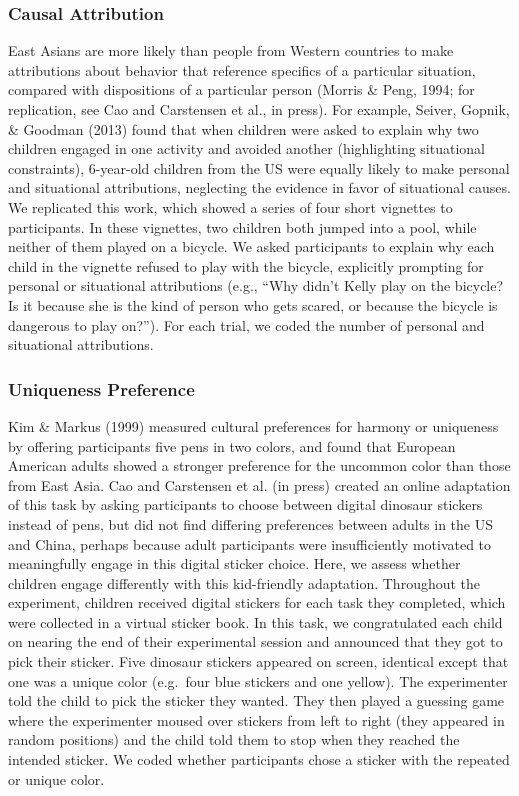 \documentclass[10pt, letterpaper]{article}
\begin{document}
\hypertarget{causal-attribution}{%
\subsubsection{Causal Attribution}\label{causal-attribution}}

East Asians are more likely than people from Western countries to make
attributions about behavior that reference specifics of a particular
situation, compared with dispositions of a particular person (Morris \&
Peng, 1994; for replication, see Cao and Carstensen et al., in press).
For example, Seiver, Gopnik, \& Goodman (2013) found that when children
were asked to explain why two children engaged in one activity and
avoided another (highlighting situational constraints), 6-year-old
children from the US were equally likely to make personal and
situational attributions, neglecting the evidence in favor of
situational causes. We replicated this work, which showed a series of
four short vignettes to participants. In these vignettes, two children
both jumped into a pool, while neither of them played on a bicycle. We
asked participants to explain why each child in the vignette refused to
play with the bicycle, explicitly prompting for personal or situational
attributions (e.g., ``Why didn't Kelly play on the bicycle? Is it
because she is the kind of person who gets scared, or because the
bicycle is dangerous to play on?''). For each trial, we coded the number
of personal and situational attributions.

\hypertarget{uniqueness-preference}{%
\subsubsection{Uniqueness Preference}\label{uniqueness-preference}}

Kim \& Markus (1999) measured cultural preferences for harmony or
uniqueness by offering participants five pens in two colors, and found
that European American adults showed a stronger preference for the
uncommon color than those from East Asia. Cao and Carstensen et al. (in
press) created an online adaptation of this task by asking participants
to choose between digital dinosaur stickers instead of pens, but did not
find differing preferences between adults in the US and China, perhaps
because adult participants were insufficiently motivated to meaningfully
engage in this digital sticker choice. Here, we assess whether children
engage differently with this kid-friendly adaptation. Throughout the
experiment, children received digital stickers for each task they
completed, which were collected in a virtual sticker book. In this task,
we congratulated each child on nearing the end of their experimental
session and announced that they got to pick their sticker. Five dinosaur
stickers appeared on screen, identical except that one was a unique
color (e.g.~four blue stickers and one yellow). The experimenter told
the child to pick the sticker they wanted. They then played a guessing
game where the experimenter moused over stickers from left to right
(they appeared in random positions) and the child told them to stop when
they reached the intended sticker. We coded whether participants chose a
sticker with the repeated or unique color.
\end{document}
